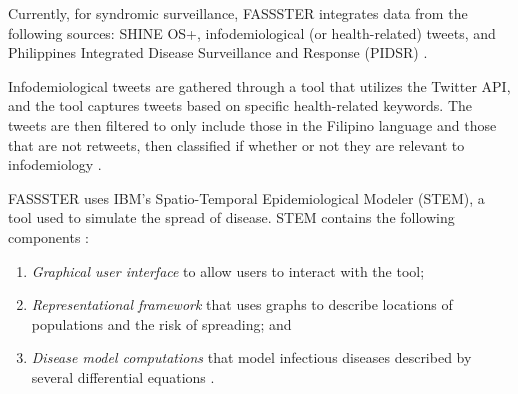 Currently, for syndromic surveillance, FASSSTER integrates data from the following sources: SHINE OS+, infodemiological (or health-related) tweets, and Philippines Integrated Disease Surveillance and Response (PIDSR) \cite{fassster}. 

Infodemiological tweets are gathered through a tool that utilizes the Twitter API, and the tool captures tweets based on specific health-related keywords. The tweets are then filtered to only include those in the Filipino language and those that are not retweets, then classified if whether or not they are relevant to infodemiology \cite{espina2016towards}.

FASSSTER uses IBM's Spatio-Temporal Epidemiological Modeler (STEM), a tool used to simulate the spread of disease. STEM contains the following components \cite{edlund2010spatiotemporal}:
\begin{enumerate}
\item \textit{Graphical user interface} to allow users to interact with the tool; 
\item \textit{Representational framework} that uses graphs to describe locations of populations and the risk of spreading; and 
\item \textit{Disease model computations} that model infectious diseases described by several differential equations \cite{anderson1992infectious}.
\end{enumerate}